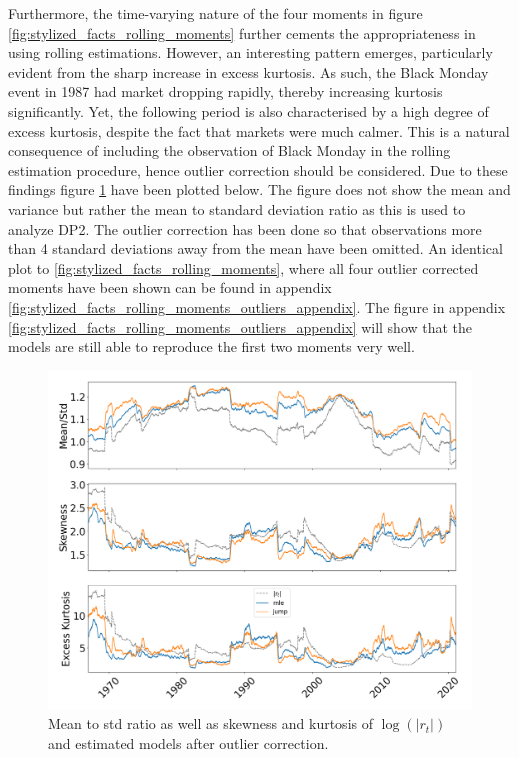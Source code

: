 Furthermore, the time-varying nature of the four moments in figure \ref{fig:stylized_facts_rolling_moments} further cements the appropriateness in using rolling estimations. However, an interesting pattern emerges, particularly evident from the sharp increase in excess kurtosis. As such, the Black Monday event in 1987 had market dropping rapidly, thereby increasing kurtosis significantly. Yet, the following period is also characterised by a high degree of excess kurtosis, despite the fact that markets were much calmer. This is a natural consequence of including the observation of Black Monday in the rolling estimation procedure, hence outlier correction should be considered. Due to these findings figure \ref{fig:stylized_facts_rolling_moments_outliers} have been plotted below. The figure does not show the mean and variance but rather the mean to standard deviation ratio as this is used to analyze DP2. The outlier correction has been done so that observations more than 4 standard deviations away from the mean have been omitted. An identical plot to \ref{fig:stylized_facts_rolling_moments}, where all four outlier corrected moments have been shown can be found in appendix \ref{fig:stylized_facts_rolling_moments_outliers_appendix}. The figure in appendix \ref{fig:stylized_facts_rolling_moments_outliers_appendix} will show that the models are still able to reproduce the first two moments very well.


\begin{figure}[H] 
    \centering
    \includegraphics[width=1.0\textwidth]{analysis/stylized_facts/images/moments_bulla_abs_outlier.png}
    \caption{Mean to std ratio as well as skewness and kurtosis of $\log(|r_t|)$ and estimated models after outlier correction.}
    \label{fig:stylized_facts_rolling_moments_outliers} 
\end{figure}

